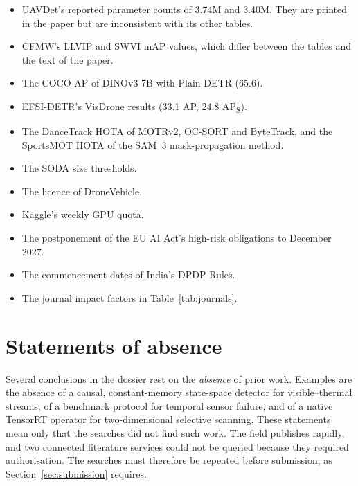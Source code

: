\begin{itemize}
  \item UAVDet's reported parameter counts of 3.74M and 3.40M. They are
        printed in the paper but are inconsistent with its other tables.
  \item CFMW's LLVIP and SWVI mAP values, which differ between the tables
        and the text of the paper.
  \item The COCO AP of DINOv3 7B with Plain-DETR (65.6).
  \item EFSI-DETR's VisDrone results (33.1 AP, 24.8 AP\textsubscript{S}).
  \item The DanceTrack HOTA of MOTRv2, OC-SORT and ByteTrack, and the
        SportsMOT HOTA of the SAM~3 mask-propagation method.
  \item The SODA size thresholds.
  \item The licence of DroneVehicle.
  \item Kaggle's weekly GPU quota.
  \item The postponement of the EU AI Act's high-risk obligations to
        December 2027.
  \item The commencement dates of India's DPDP Rules.
  \item The journal impact factors in Table~\ref{tab:journals}.
\end{itemize}

\section{Statements of absence}

Several conclusions in the dossier rest on the \emph{absence} of prior work.
Examples are the absence of a causal, constant-memory state-space detector
for visible--thermal streams, of a benchmark protocol for temporal sensor
failure, and of a native TensorRT operator for two-dimensional selective
scanning. These statements mean only that the searches did not find such
work. The field publishes rapidly, and two connected literature services
could not be queried because they required authorisation. The searches must
therefore be repeated before submission, as Section~\ref{sec:submission}
requires.
